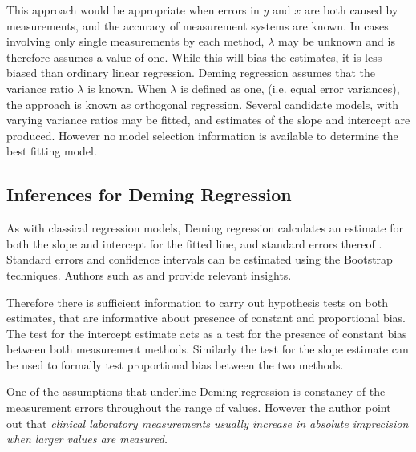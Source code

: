 \documentclass[12pt, a4paper]{report}
\theoremstyle{plain}
\theoremstyle{definition}
\theoremstyle{remark}
\begin{document}




This approach would be appropriate when errors in $y$ and $x$ are both caused by measurements, and the accuracy of measurement systems are known. In cases involving only single measurements by each method, $\lambda$ may be unknown and is therefore assumes a value of one. While this will bias the estimates, it is less biased than ordinary linear regression. Deming regression assumes that the variance ratio $\lambda$ is known. When $\lambda$ is defined as one, (i.e. equal error variances), the approach is known as orthogonal regression. Several candidate models, with varying variance ratios may be fitted, and estimates of the slope and intercept are produced. However no model selection information is available to determine the best fitting model.

\subsection{Inferences for Deming Regression}
As with classical regression models, Deming regression calculates an estimate for both the slope and intercept for the fitted line, and standard errors thereof  \citet{CornCoch}. Standard errors and confidence intervals can be estimated using the Bootstrap techniques. Authors such as \citet{carpenter2000bootstrap} and \citet{johnson2001bootstrap} provide relevant insights. 

Therefore there is sufficient information to carry out hypothesis tests on both estimates, that are informative about presence of constant and proportional bias. The test for the intercept estimate acts as a test for the presence of constant bias between both measurement methods. Similarly the test for the slope estimate can be used to formally test proportional bias between the two methods.

One of the assumptions that underline Deming regression is constancy of the measurement errors throughout the range of values.
However the author point out that \emph{clinical laboratory measurements usually increase in absolute imprecision when larger values are measured.}
\end{document}
